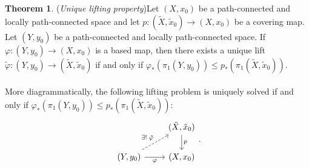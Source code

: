 \documentclass[letterpaper,11pt,twoside]{article}
\theoremstyle{definition}
\theoremstyle{definition}
\newtheorem{theorem}[proposition]{Theorem}
\theoremstyle{definition}
\theoremstyle{definition}
\theoremstyle{definition}
\theoremstyle{definition}
\theoremstyle{remark}
\theoremstyle{definition}
\begin{document}
\begin{theorem}
	(\textit{Unique lifting property})\label{T-6.1.7} Let $ (X,x_0) $ be a path-connected and locally path-connected space and let $ p : (\tilde{X},\tilde{x}_0) \to (X,x_0)$ be a covering map. Let $ (Y,y_0) $ be a path-connected and locally path-connected space. If $ \varphi : (Y,y_0) \to (X,x_0) $ is a based map, then there exists a unique lift $ \tilde{\varphi} : (Y,y_0) \to (\tilde{X},\tilde{x}_0) $ if and only if $ \varphi_*(\pi_1(Y,y_0))  \le p_*(\pi_1(\tilde{X},\tilde{x}_0))$. \\\\
	More diagrammatically, the following lifting problem is uniquely solved if and only if $ \varphi_*(\pi_1(Y,y_0))  \le p_*(\pi_1(\tilde{X},\tilde{x}_0)) $:
	\[\begin{tikzcd}
		& {(\tilde{X},\tilde x_0)} \\
		{(Y,y_0)} & {(X,x_0)}
		\arrow["p", from=1-2, to=2-2]
		\arrow["\varphi"', from=2-1, to=2-2]
		\arrow["{\exists !\;\tilde{\varphi}}", dashed, from=2-1, to=1-2]
	\end{tikzcd}.\]
\end{theorem}
\end{document}
